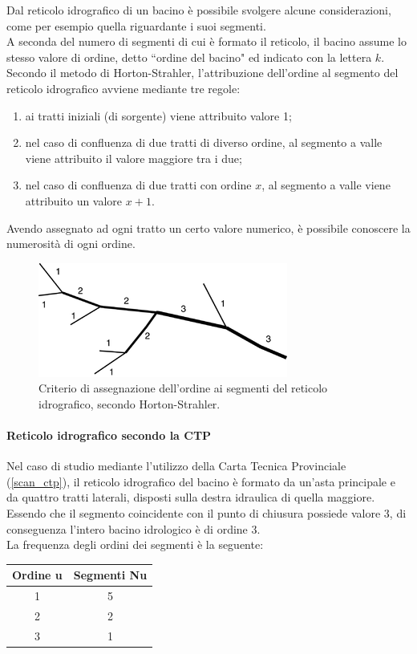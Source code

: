 Dal reticolo idrografico di un bacino è possibile svolgere alcune considerazioni, come per esempio quella riguardante i suoi segmenti.\\
A seconda del numero di segmenti di cui è formato il reticolo, il bacino assume lo stesso valore di ordine, detto ``ordine del bacino" ed indicato con la lettera $k$.\\
Secondo il metodo di Horton-Strahler, l'attribuzione dell'ordine al segmento del reticolo idrografico avviene mediante tre regole: 
\begin{enumerate}
    \item ai tratti iniziali (di sorgente) viene attribuito valore 1;
    \item nel caso di confluenza di due tratti di diverso ordine, al segmento a valle viene attribuito il valore maggiore tra i due;
    \item nel caso di confluenza di due tratti con ordine $x$, al segmento a valle viene attribuito un valore $x+1$.
\end{enumerate} 
Avendo assegnato ad ogni tratto un certo valore numerico, è possibile conoscere la numerosità di ogni ordine.
\begin{figure}[H]\centering
    \includegraphics[scale=.75]{immagini/ordine_horton.png}
    \caption{Criterio di assegnazione dell'ordine ai segmenti del reticolo idrografico, secondo Horton-Strahler.}
  \label{ordine_horton}
\end{figure}
 
\paragraph{Reticolo idrografico secondo la CTP}
Nel caso di studio mediante l'utilizzo della Carta Tecnica Provinciale (\ref{scan_ctp}), il reticolo idrografico del bacino è formato da un'asta principale e da quattro tratti laterali, disposti sulla destra idraulica di quella maggiore.\\
Essendo che il segmento coincidente con il punto di chiusura possiede valore 3, di conseguenza l'intero bacino idrologico è di ordine 3.\\
La frequenza degli ordini dei segmenti è la seguente:
\begin{table}[H] \centering
    \begin{tabular}{cc}
\toprule
    Ordine u & Segmenti Nu \\
\midrule    
    1        & 5           \\
    2        & 2           \\
    3        & 1           \\
\bottomrule    
\end{tabular}
\end{table}
